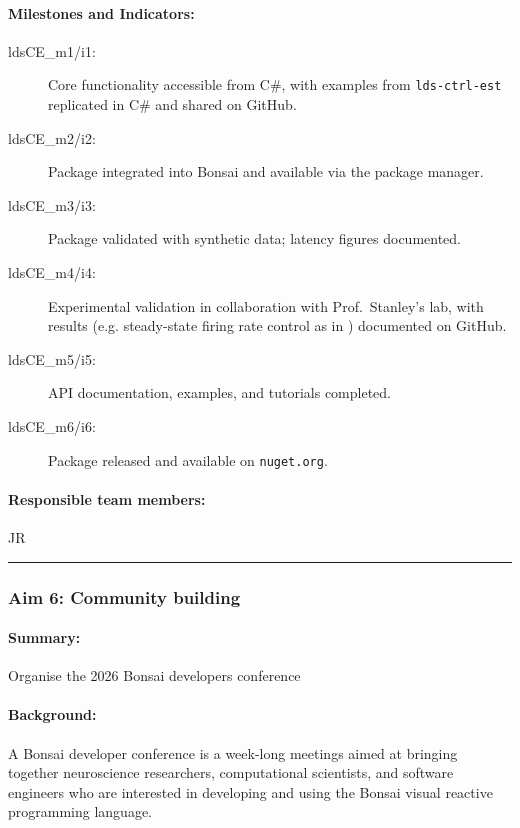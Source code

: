 \paragraph{Milestones and Indicators:}  

\begin{description}
    \item[ldsCE\_m1/i1:] Core functionality accessible from C\#, with examples from \texttt{lds-ctrl-est} replicated in C\# and shared on GitHub.  
    \item[ldsCE\_m2/i2:] Package integrated into Bonsai and available via the package manager.  
    \item[ldsCE\_m3/i3:] Package validated with synthetic data; latency figures documented.  
    \item[ldsCE\_m4/i4:] Experimental validation in collaboration with Prof.~Stanley’s lab, with results (e.g. steady-state firing rate control as in \citet{bolusEtAl21}) documented on GitHub.  
    \item[ldsCE\_m5/i5:] API documentation, examples, and tutorials completed.  
    \item[ldsCE\_m6/i6:] Package released and available on \texttt{nuget.org}.  
\end{description}

\paragraph{Responsible team members:} JR

\noindent\rule{\textwidth}{1pt}
\subsubsection{Aim 6: Community building}
\paragraph{Summary:} Organise the 2026 Bonsai developers conference

\paragraph{Background:} A Bonsai developer conference is a week-long
meetings aimed at bringing together neuroscience researchers, computational
scientists, and software engineers who are interested in developing and using
the Bonsai visual reactive programming language.


